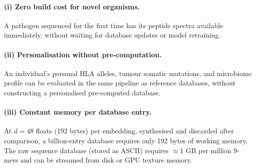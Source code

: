 \documentclass[twocolumn,11pt,a4paper]{article}
\theoremstyle{definition}
\theoremstyle{remark}
\begin{document}
\paragraph{(i) Zero build cost for novel organisms.}
A pathogen sequenced for the first time has its peptide spectra available
immediately, without waiting for database updates or model retraining.

\paragraph{(ii) Personalisation without pre-computation.}
An individual's personal HLA alleles, tumour somatic mutations, and microbiome
profile can be evaluated in the same pipeline as reference databases, without
constructing a personalised pre-computed database.

\paragraph{(iii) Constant memory per database entry.}
At $d = 48$ floats (192 bytes) per embedding, synthesised and discarded after
comparison, a billion-entry database requires only 192 bytes of working
memory. The raw sequence database (stored as ASCII) requires $\approx 1$ GB
per million 9-mers and can be streamed from disk or GPU texture memory.
\end{document}
